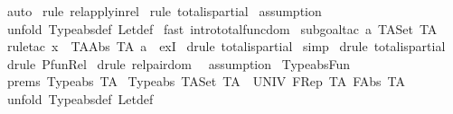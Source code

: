 \begin{isabellebody}
\ auto\isanewline
{}\isamarkupfalse%
\ {\isacharparenleft}rule\ rel{\isacharunderscore}apply{\isacharunderscore}in{\isacharunderscore}rel{\isacharparenright}\isanewline
{}\isamarkupfalse%
\ {\isacharparenleft}rule\ total{\isacharunderscore}is{\isacharunderscore}partial{\isacharparenright}\isanewline
{}\isamarkupfalse%
\ assumption\isanewline
{}\isamarkupfalse%
\ {\isacharparenleft}unfold\ Typeabs{\isacharunderscore}def\ Let{\isacharunderscore}def{\isacharparenright}\isanewline
{}\isamarkupfalse%
\ {\isacharparenleft}fast\ intro{\isacharcolon}total{\isacharunderscore}func{\isacharunderscore}dom{\isacharparenright}\isanewline
{}\isamarkupfalse%
\ {\isacharparenleft}subgoal{\isacharunderscore}tac\ {\isachardoublequoteopen}a{\isacharcolon}\ TASet\ TA{\isachardoublequoteclose}{\isacharparenright}\isanewline
{}\isamarkupfalse%
\ {\isacharparenleft}rule{\isacharunderscore}tac\ x\ {\isacharequal}\ {\isachardoublequoteopen}TAAbs\ TA\ a{\isachardoublequoteclose}\ \ exI{\isacharparenright}\isanewline
{}\isamarkupfalse%
\ {\isacharparenleft}drule\ total{\isacharunderscore}is{\isacharunderscore}partial{\isacharparenright}\isanewline
{}\isamarkupfalse%
\ simp\isanewline
{}\isamarkupfalse%
\ {\isacharparenleft}drule\ total{\isacharunderscore}is{\isacharunderscore}partial{\isacharparenright}\isanewline
{}\isamarkupfalse%
\ {\isacharparenleft}drule\ Pfun{\isacharunderscore}Rel{\isacharparenright}\isanewline
{}\isamarkupfalse%
\ {\isacharparenleft}drule\ rel{\isacharunderscore}pair{\isacharunderscore}dom\ {\isacharparenright}\isanewline
{}\isamarkupfalse%
\ assumption{\isacharplus}\isanewline
{}\isamarkupfalse%
%
\endisatagproof
{\isafoldproof}%
%
\isadelimproof
\isanewline
%
\endisadelimproof
\isanewline
{}\isamarkupfalse%
\ Typeabs{\isacharunderscore}Fun{\isacharcolon}\isanewline
{}\ prems{\isacharcolon}\ {\isachardoublequoteopen}Typeabs\ TA{\isachardoublequoteclose}\isanewline
{}\ {\isachardoublequoteopen}Typeabs\ {\isacharparenleft}TASet\ TA\ {\isacharminus}{\isacharminus}{\isacharminus}{\isachargreater}\ UNIV{\isacharcomma}\ FRep\ TA{\isacharcomma}\ FAbs\ TA{\isacharparenright}{\isachardoublequoteclose}\isanewline
%
\isadelimproof
%
\endisadelimproof
%
\isatagproof
{}\isamarkupfalse%
\ {\isacharparenleft}unfold\ Typeabs{\isacharunderscore}def\ Let{\isacharunderscore}def{\isacharparenright}\isanewline

\end{isabellebody}

